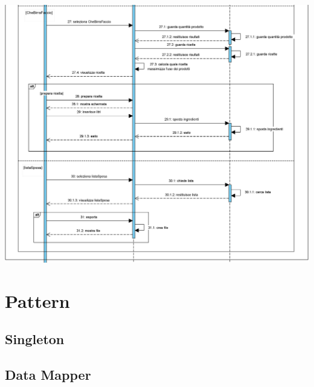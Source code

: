 \documentclass[a4paper, titlepage]{article}
\begin{document}
\includegraphics[scale=0.30]{Immagini/Sequence Diagram_Brew Day!_6.png}
\newpage
\section{Pattern}

\subsection{Singleton}
\subsection{Data Mapper}

\end{document}
